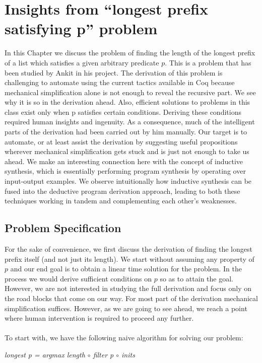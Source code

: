\chapter {Insights from ``longest prefix
satisfying p'' problem}

In this Chapter we discuss the problem of finding the length of the longest prefix of a list which satisfies a given arbitrary predicate $p$. This is a problem that has been studied by Ankit in his project. The derivation of this problem is challenging to automate using the current tactics available in Coq because mechanical simplification alone is not enough to reveal the recursive part. We see why it is so in the derivation ahead. Also, efficient solutions to problems in this class exist only when p satisfies certain conditions. Deriving these conditions required human insights and ingenuity. As a consequence, much of the intelligent parts of the derivation had been carried out by him manually. Our target is to automate, or at least assist the derivation by suggesting useful propositions wherever mechanical simplification gets stuck and is just not enough to take us ahead. We make an interesting connection here with the concept of inductive synthesis, which is essentially performing program synthesis by operating over input-output examples. We observe intuitionally how inductive synthesis can be fused into the deductive program derivation approach, leading to both these techniques working in tandem and complementing each other's weaknesses.

\section{Problem Specification}
For the sake of convenience, we first discuss the derivation of finding the longest prefix itself (and not just its length). We start without assuming any property of $p$ and our end goal is to obtain a linear time solution for the problem. In the process we would derive sufficient conditions on $p$ so as to attain the goal. However, we are not interested in studying the full derivation and focus only on the road blocks that come on our way. For most part of the derivation mechanical simplification suffices. However, as we are going to see ahead, we reach a point where human intervention is required to proceed any further. \\\\
To start with, we have the following naive algorithm for solving our problem:

\begin{center}
\emph{longest p = argmax length $\circ$ filter p $\circ$ inits}
\end{center}


